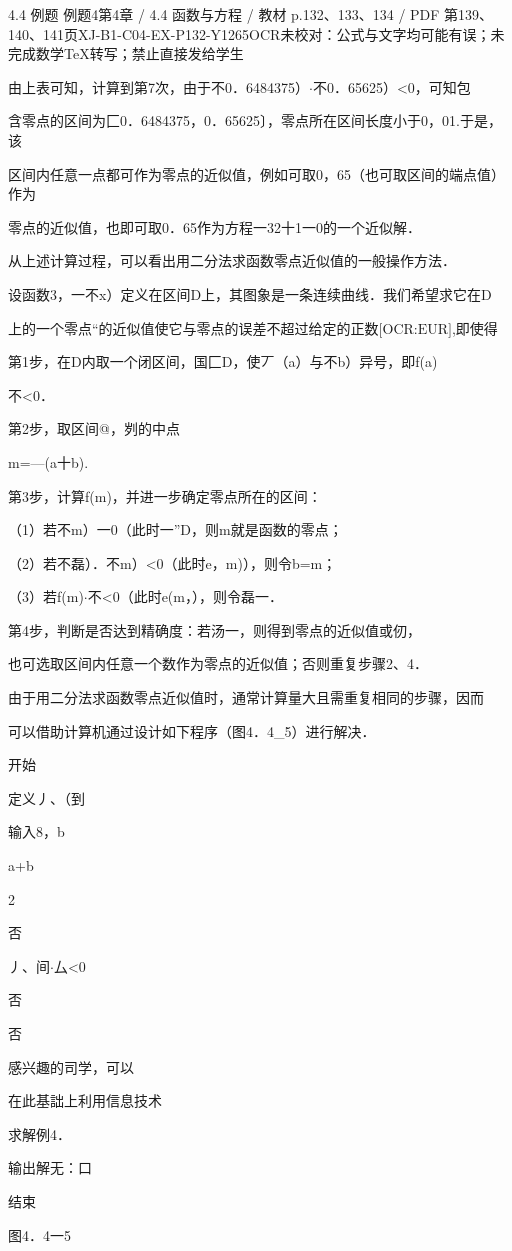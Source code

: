 \begin{bankitem}{4.4 例题 例题4}{第4章 / 4.4 函数与方程 / 教材 p.132、133、134 / PDF 第139、140、141页}{XJ-B1-C04-EX-P132-Y1265}{OCR未校对：公式与文字均可能有误；未完成数学TeX转写；禁止直接发给学生}
\begin{ocrdraft}
由上表可知，计算到第7次，由于不0．6484375）\ensuremath{\cdot}不0．65625）<0，可知包
\par
含零点的区间为匚0．6484375，0．65625〕，零点所在区间长度小于0，01.于是，该
\par
区间内任意一点都可作为零点的近似值，例如可取0，65（也可取区间的端点值）作为
\par
零点的近似值，也即可取0．65作为方程一32十1一0的一个近似解．
\par
从上述计算过程，可以看出用二分法求函数零点近似值的一般操作方法．
\par
设函数3，一不x）定义在区间D上，其图象是一条连续曲线．我们希望求它在D
\par
上的一个零点“的近似值使它与零点的误差不超过给定的正数\ensuremath{\text{[OCR:EUR]}},即使得
\par
第1步，在D内取一个闭区间，国匚D，使丆（a）与不b）异号，即f(a)
\par
不<0．
\par
第2步，取区间@，刿的中点
\par
m=—(a十b).
\par
第3步，计算f(m)，并进一步确定零点所在的区间：
\par
（1）若不m）一0（此时一”D，则m就是函数的零点；
\par
（2）若不磊）．不m）<0（此时e，m)），则令b=m；
\par
（3）若f(m)\ensuremath{\cdot}不<0（此时e(m，），则令磊一．
\par
第4步，判断是否达到精确度：若汤一，则得到零点的近似值或仞，
\par
也可选取区间内任意一个数作为零点的近似值；否则重复步骤2、4．
\par
由于用二分法求函数零点近似值时，通常计算量大且需重复相同的步骤，因而
\par
[教材p.134 / PDF第141页]
\par
可以借助计算机通过设计如下程序（图4．4\_5）进行解决．
\par
开始
\par
定义丿、（到
\par
输入8，b
\par
a+b
\par
2
\par
否
\par
丿、间\ensuremath{\cdot}厶<0
\par
否
\par
否
\par
感兴趣的司学，可以
\par
在此基詘上利用信息技术
\par
求解例4．
\par
输出解无：口
\par
结束
\par
图4．4一5
\end{ocrdraft}
\end{bankitem}
